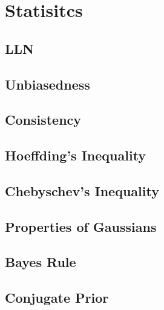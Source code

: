 \documentclass[18pt,a3paper,landscape, ncols=2]{cheatsheet}
\begin{document}

\section{Statisitcs} \seperator
	\subsection{LLN}
		\begin{mdframed}
		\end{mdframed}
	\subsection{Unbiasedness}
		\begin{mdframed}
		\end{mdframed}
	\subsection{Consistency}
		\begin{mdframed}
		\end{mdframed}
	\subsection{Hoeffding's Inequality}
		\begin{mdframed}
		\end{mdframed}
	\subsection{Chebyschev's Inequality}
		\begin{mdframed}
		\end{mdframed}
	\subsection{Properties of Gaussians}
		\begin{mdframed}
		\end{mdframed}
	\subsection{Bayes Rule} %
		\begin{mdframed}
		\end{mdframed}
	\subsection{Conjugate Prior}
		\begin{mdframed}
		\end{mdframed}
	
\end{document}
